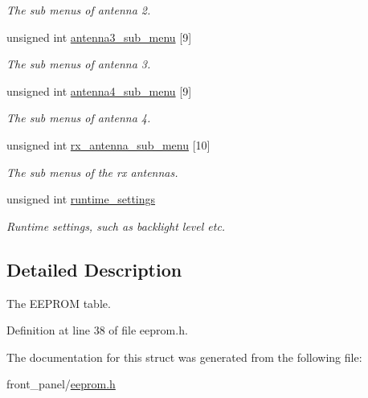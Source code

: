 \begin{CompactItemize}
\begin{CompactList}\small\item\em The sub menus of antenna 2. \item\end{CompactList}\item 
\hypertarget{structstruct__eeprom__table_c82f9e7a98208b5901e450fff8912fac}{
unsigned int \hyperlink{structstruct__eeprom__table_c82f9e7a98208b5901e450fff8912fac}{antenna3\_\-sub\_\-menu} \mbox{[}9\mbox{]}}
\label{structstruct__eeprom__table_c82f9e7a98208b5901e450fff8912fac}

\begin{CompactList}\small\item\em The sub menus of antenna 3. \item\end{CompactList}\item 
\hypertarget{structstruct__eeprom__table_070a7b60d374a07d456e56915fc639e3}{
unsigned int \hyperlink{structstruct__eeprom__table_070a7b60d374a07d456e56915fc639e3}{antenna4\_\-sub\_\-menu} \mbox{[}9\mbox{]}}
\label{structstruct__eeprom__table_070a7b60d374a07d456e56915fc639e3}

\begin{CompactList}\small\item\em The sub menus of antenna 4. \item\end{CompactList}\item 
\hypertarget{structstruct__eeprom__table_2fae10ea3cc4e90363a7cbb5ff067f85}{
unsigned int \hyperlink{structstruct__eeprom__table_2fae10ea3cc4e90363a7cbb5ff067f85}{rx\_\-antenna\_\-sub\_\-menu} \mbox{[}10\mbox{]}}
\label{structstruct__eeprom__table_2fae10ea3cc4e90363a7cbb5ff067f85}

\begin{CompactList}\small\item\em The sub menus of the rx antennas. \item\end{CompactList}\item 
\hypertarget{structstruct__eeprom__table_6faadb529c3c80352df777053fccda57}{
unsigned int \hyperlink{structstruct__eeprom__table_6faadb529c3c80352df777053fccda57}{runtime\_\-settings}}
\label{structstruct__eeprom__table_6faadb529c3c80352df777053fccda57}

\begin{CompactList}\small\item\em Runtime settings, such as backlight level etc. \item\end{CompactList}\end{CompactItemize}


\subsection{Detailed Description}
The EEPROM table. 

Definition at line 38 of file eeprom.h.

The documentation for this struct was generated from the following file:\begin{CompactItemize}
\item 
front\_\-panel/\hyperlink{eeprom_8h}{eeprom.h}\end{CompactItemize}
